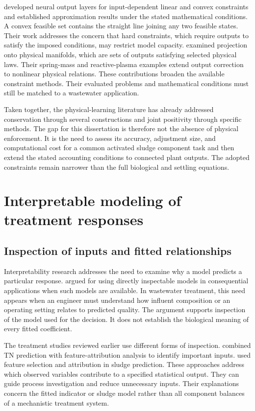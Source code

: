 \citet{Min2024} developed neural output layers for input-dependent linear and convex constraints and established approximation results under the stated mathematical conditions. A convex feasible set contains the straight line joining any two feasible states. Their work addresses the concern that hard constraints, which require outputs to satisfy the imposed conditions, may restrict model capacity. \citet{Valente2025} examined projection onto physical manifolds, which are sets of outputs satisfying selected physical laws. Their spring-mass and reactive-plasma examples extend output correction to nonlinear physical relations. These contributions broaden the available constraint methods. Their evaluated problems and mathematical conditions must still be matched to a wastewater application.

Taken together, the physical-learning literature has already addressed conservation through several constructions and joint positivity through specific methods. The gap for this dissertation is therefore not the absence of physical enforcement. It is the need to assess its accuracy, adjustment size, and computational cost for a common activated sludge component task and then extend the stated accounting conditions to connected plant outputs. The adopted constraints remain narrower than the full biological and settling equations.

\section{Interpretable modeling of treatment responses}

\subsection{Inspection of inputs and fitted relationships}

Interpretability research addresses the need to examine why a model predicts a particular response. \citet{Rudin2019} argued for using directly inspectable models in consequential applications when such models are available. In wastewater treatment, this need appears when an engineer must understand how influent composition or an operating setting relates to predicted quality. The argument supports inspection of the model used for the decision. It does not establish the biological meaning of every fitted coefficient.

The treatment studies reviewed earlier use different forms of inspection. \citet{Wang2025} combined TN prediction with feature-attribution analysis to identify important inputs. \citet{Ekinci2023} used feature selection and attribution in sludge prediction. These approaches address which observed variables contribute to a specified statistical output. They can guide process investigation and reduce unnecessary inputs. Their explanations concern the fitted indicator or sludge model rather than all component balances of a mechanistic treatment system.

